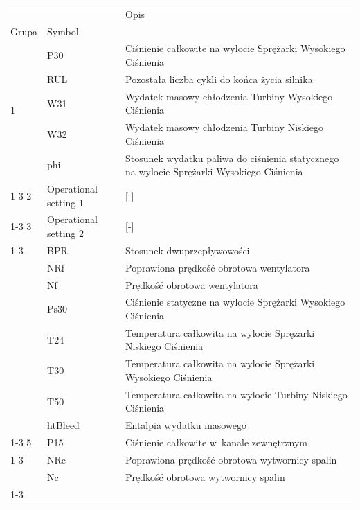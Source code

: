 \begin{tabular}{lll}
\toprule
 &  & Opis \\
Grupa & Symbol &  \\
\midrule
\multirow[t]{5}{*}{1} & P30 & Ciśnienie całkowite na wylocie Sprężarki Wysokiego Ciśnienia \\
 & RUL & Pozostała liczba cykli do końca życia silnika \\
 & W31 & Wydatek masowy chłodzenia Turbiny Wysokiego Ciśnienia \\
 & W32 & Wydatek masowy chłodzenia Turbiny Niskiego Ciśnienia \\
 & phi & Stosunek wydatku paliwa do ciśnienia statycznego na wylocie Sprężarki Wysokiego Ciśnienia \\
\cline{1-3}
2 & Operational setting 1 & [-] \\
\cline{1-3}
3 & Operational setting 2 & [-] \\
\cline{1-3}
\multirow[t]{8}{*}{4} & BPR & Stosunek dwuprzepływowości \\
 & NRf & Poprawiona prędkość obrotowa wentylatora \\
 & Nf & Prędkość obrotowa wentylatora \\
 & Ps30 & Ciśnienie statyczne na wylocie Sprężarki Wysokiego Ciśnienia \\
 & T24 & Temperatura całkowita na wylocie Sprężarki Niskiego Ciśnienia \\
 & T30 & Temperatura całkowita na wylocie Sprężarki Wysokiego Ciśnienia \\
 & T50 & Temperatura całkowita na wylocie Turbiny Niskiego Ciśnienia \\
 & htBleed & Entalpia wydatku masowego \\
\cline{1-3}
5 & P15 & Ciśnienie całkowite w~kanale zewnętrznym \\
\cline{1-3}
\multirow[t]{2}{*}{6} & NRc & Poprawiona prędkość obrotowa wytwornicy spalin \\
 & Nc & Prędkość obrotowa wytwornicy spalin \\
\cline{1-3}
\bottomrule
\end{tabular}
